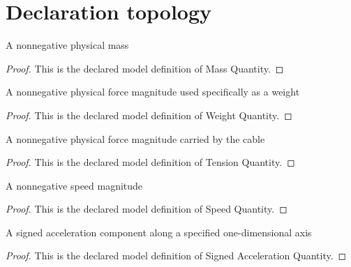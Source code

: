 \section{Declaration topology}
\begin{definition}
  \label{def:physics:phyx-mini-0800:phyxminiproblems-problemphyxmini0800-massquantity}
  A nonnegative physical mass
\end{definition}
\begin{proof}
  This is the declared model definition of Mass Quantity.
\end{proof}
\begin{definition}
  \label{def:physics:phyx-mini-0800:phyxminiproblems-problemphyxmini0800-weightquantity}
  A nonnegative physical force magnitude used specifically as a weight
\end{definition}
\begin{proof}
  This is the declared model definition of Weight Quantity.
\end{proof}
\begin{definition}
  \label{def:physics:phyx-mini-0800:phyxminiproblems-problemphyxmini0800-tensionquantity}
  A nonnegative physical force magnitude carried by the cable
\end{definition}
\begin{proof}
  This is the declared model definition of Tension Quantity.
\end{proof}
\begin{definition}
  \label{def:physics:phyx-mini-0800:phyxminiproblems-problemphyxmini0800-speedquantity}
  A nonnegative speed magnitude
\end{definition}
\begin{proof}
  This is the declared model definition of Speed Quantity.
\end{proof}
\begin{definition}
  \label{def:physics:phyx-mini-0800:phyxminiproblems-problemphyxmini0800-signedaccelerationquantity}
  A signed acceleration component along a specified one-dimensional axis
\end{definition}
\begin{proof}
  This is the declared model definition of Signed Acceleration Quantity.
\end{proof}

